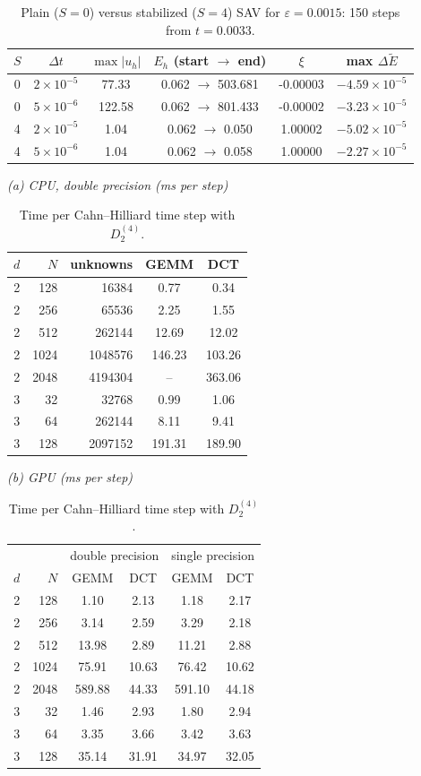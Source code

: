 \documentclass[11pt]{article}
\begin{document}
\begin{table}[htbp]\centering\small
\caption{Plain ($S=0$) versus stabilized ($S=4$) SAV for $\varepsilon=0.0015$: 150 steps from $t=0.0033$.}
\begin{tabular}{cc cccc}
\toprule
$S$ & $\Delta t$ & $\max|u_h|$ & $E_h$ (start $\to$ end) & $\xi$ & max $\Delta\tilde E$\\
\midrule
0 & $2{\times}10^{-5}$ & 77.33 & 0.062 $\to$ 503.681 & -0.00003 & $-4.59{\times}10^{-5}$\\
0 & $5{\times}10^{-6}$ & 122.58 & 0.062 $\to$ 801.433 & -0.00002 & $-3.23{\times}10^{-5}$\\
4 & $2{\times}10^{-5}$ & 1.04 & 0.062 $\to$ 0.050 & 1.00002 & $-5.02{\times}10^{-5}$\\
4 & $5{\times}10^{-6}$ & 1.04 & 0.062 $\to$ 0.058 & 1.00000 & $-2.27{\times}10^{-5}$\\
\bottomrule
\end{tabular}
\end{table}

\begin{table}[htbp]\centering\small
\caption{Time per Cahn--Hilliard time step with $D_2^{(4)}$.}
\textit{(a) CPU, double precision (ms per step)}\\[2pt]
\begin{tabular}{rr r cc}
\toprule
$d$ & $N$ & unknowns & GEMM & DCT\\
\midrule
2 & 128 & 16384 & 0.77 & 0.34\\
2 & 256 & 65536 & 2.25 & 1.55\\
2 & 512 & 262144 & 12.69 & 12.02\\
2 & 1024 & 1048576 & 146.23 & 103.26\\
2 & 2048 & 4194304 & -- & 363.06\\
3 & 32 & 32768 & 0.99 & 1.06\\
3 & 64 & 262144 & 8.11 & 9.41\\
3 & 128 & 2097152 & 191.31 & 189.90\\
\bottomrule
\end{tabular}

\medskip
\textit{(b) GPU (ms per step)}\\[2pt]
\begin{tabular}{rr cc cc}
\toprule
& & \multicolumn{2}{c}{double precision} & \multicolumn{2}{c}{single precision}\\
$d$ & $N$ & GEMM & DCT & GEMM & DCT\\
\midrule
2 & 128 & 1.10 & 2.13 & 1.18 & 2.17\\
2 & 256 & 3.14 & 2.59 & 3.29 & 2.18\\
2 & 512 & 13.98 & 2.89 & 11.21 & 2.88\\
2 & 1024 & 75.91 & 10.63 & 76.42 & 10.62\\
2 & 2048 & 589.88 & 44.33 & 591.10 & 44.18\\
3 & 32 & 1.46 & 2.93 & 1.80 & 2.94\\
3 & 64 & 3.35 & 3.66 & 3.42 & 3.63\\
3 & 128 & 35.14 & 31.91 & 34.97 & 32.05\\
\bottomrule
\end{tabular}
\end{table}
\end{document}
